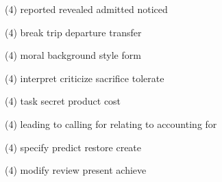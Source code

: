 \begin{tasks}(4)
	\task reported
	\task revealed
	\task admitted
	\task noticed
\end{tasks}
\item
\begin{tasks}(4)
	\task break
	\task trip
	\task departure
	\task transfer
\end{tasks}
\item
\begin{tasks}(4)
	\task moral
	\task background
	\task style
	\task form
\end{tasks}
\item
\begin{tasks}(4)
	\task interpret
	\task criticize
	\task sacrifice
	\task tolerate
\end{tasks}
\item
\begin{tasks}(4)
	\task task
	\task secret
	\task product
	\task cost
\end{tasks}
\item
\begin{tasks}(4)
	\task leading to
	\task calling for
	\task relating to
	\task accounting for
\end{tasks}
\item
\begin{tasks}(4)
	\task specify
	\task predict
	\task restore
	\task create
\end{tasks}
\item
\begin{tasks}(4)
	\task modify
	\task review
	\task present
	\task achieve
\end{tasks}